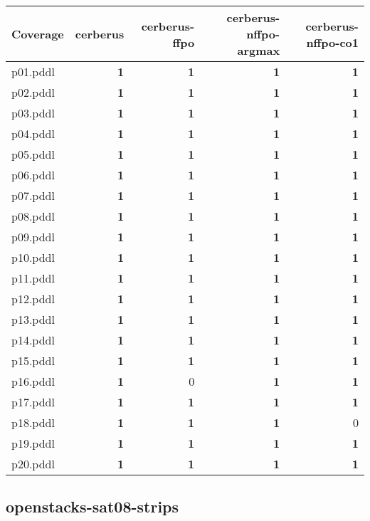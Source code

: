 \documentclass{article}
\begin{document}
\begin{tabular}{@{}lrrrr@{}}
Coverage & cerberus & cerberus-ffpo & cerberus-nffpo-argmax & cerberus-nffpo-co1 \\
\midrule
p01.pddl & \textbf{1} & \textbf{1} & \textbf{1} & \textbf{1} \\
p02.pddl & \textbf{1} & \textbf{1} & \textbf{1} & \textbf{1} \\
p03.pddl & \textbf{1} & \textbf{1} & \textbf{1} & \textbf{1} \\
p04.pddl & \textbf{1} & \textbf{1} & \textbf{1} & \textbf{1} \\
p05.pddl & \textbf{1} & \textbf{1} & \textbf{1} & \textbf{1} \\
p06.pddl & \textbf{1} & \textbf{1} & \textbf{1} & \textbf{1} \\
p07.pddl & \textbf{1} & \textbf{1} & \textbf{1} & \textbf{1} \\
p08.pddl & \textbf{1} & \textbf{1} & \textbf{1} & \textbf{1} \\
p09.pddl & \textbf{1} & \textbf{1} & \textbf{1} & \textbf{1} \\
p10.pddl & \textbf{1} & \textbf{1} & \textbf{1} & \textbf{1} \\
p11.pddl & \textbf{1} & \textbf{1} & \textbf{1} & \textbf{1} \\
p12.pddl & \textbf{1} & \textbf{1} & \textbf{1} & \textbf{1} \\
p13.pddl & \textbf{1} & \textbf{1} & \textbf{1} & \textbf{1} \\
p14.pddl & \textbf{1} & \textbf{1} & \textbf{1} & \textbf{1} \\
p15.pddl & \textbf{1} & \textbf{1} & \textbf{1} & \textbf{1} \\
p16.pddl & \textbf{1} & 0 & \textbf{1} & \textbf{1} \\
p17.pddl & \textbf{1} & \textbf{1} & \textbf{1} & \textbf{1} \\
p18.pddl & \textbf{1} & \textbf{1} & \textbf{1} & 0 \\
p19.pddl & \textbf{1} & \textbf{1} & \textbf{1} & \textbf{1} \\
p20.pddl & \textbf{1} & \textbf{1} & \textbf{1} & \textbf{1} \\
\end{tabular}

\hypertarget{coverage-openstacks-sat08-strips}{}
\subsection*{openstacks-sat08-strips}
\end{document}
